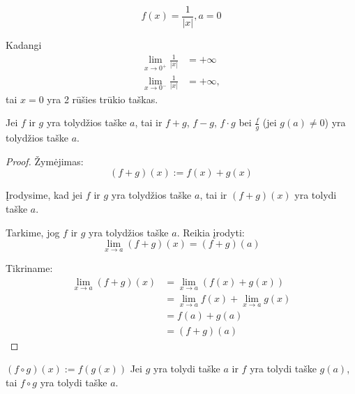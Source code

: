 \begin{exmp}
  \begin{equation*}
    f(x) = \frac{1}{|x|}, a = 0
  \end{equation*}

  Kadangi
  \begin{align*}
    \lim_{x \to 0^{+}} \frac{1}{|x|} &= +\infty \\
    \lim_{x \to 0^{-}} \frac{1}{|x|} &= +\infty,
  \end{align*}
  tai $x = 0$ yra 2 rūšies trūkio taškas.
\end{exmp}

\begin{prop}
  Jei $f$ ir $g$ yra tolydžios taške $a$, tai ir 
  $f + g$, $f - g$, $f \cdot g$ bei $\frac{f}{g}$ (jei $g(a) \neq 0$) 
  yra tolydžios taške $a$.

  \begin{proof}
    Žymėjimas:
    \begin{equation*}
      (f + g)(x) := f(x) + g(x)
    \end{equation*}

    Įrodysime, kad jei $f$ ir $g$ yra tolydžios taške $a$, tai ir 
    $(f + g)(x)$ yra tolydi taške $a$.

    Tarkime, jog $f$ ir $g$ yra tolydžios taške $a$. Reikia įrodyti:
    \begin{equation*}
      \lim_{x \to a} (f + g)(x) = (f + g)(a)
    \end{equation*}

    Tikriname:
    \begin{align*}
      \lim _{x \to a} (f + g)(x)
      &= \lim _{x \to a} (f(x) + g(x)) \\
      &= \lim _{x \to a} f(x) + \lim _{x \to a} g(x) \\
      &= f(a) + g(a) \\
      &= (f + g)(a)
    \end{align*}
  \end{proof}
\end{prop}

\begin{prop}
  $ (f \circ g)(x) := f(g(x))$ Jei $g$ yra tolydi taške $a$ ir 
  $f$ yra tolydi taške $g(a)$, tai $f \circ g$ yra tolydi taške $a$.
\end{prop}
